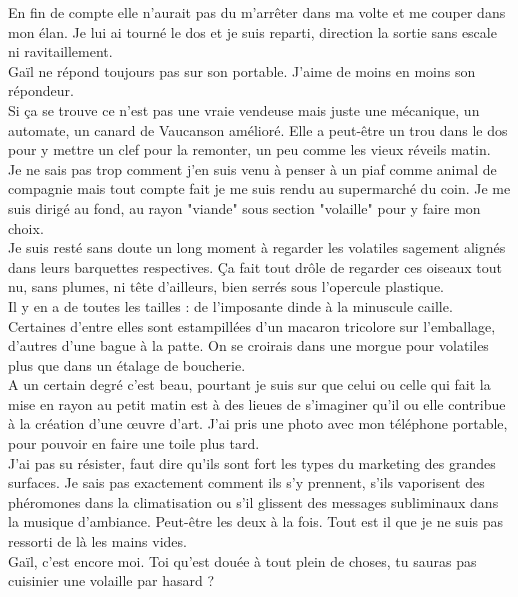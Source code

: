 En fin de compte elle n'aurait pas du m'arrêter dans ma volte et me couper dans mon élan. Je lui ai tourné le dos et je suis reparti, direction la sortie sans escale ni ravitaillement. \\

Gaïl ne répond toujours pas sur son portable. J'aime de moins en moins son répondeur. \\

Si ça se trouve ce n'est pas une vraie vendeuse mais juste une mécanique, un automate, un canard de Vaucanson amélioré. Elle a peut-être un trou dans le dos pour y mettre un clef pour la remonter, un peu comme les vieux réveils matin.\\

Je ne sais pas trop comment j'en suis venu à penser à un piaf comme animal de compagnie mais tout compte fait je me suis rendu au supermarché du coin. Je me suis dirigé au fond, au rayon "viande" sous section "volaille" pour y faire mon choix. \\
Je suis resté sans doute un long moment à regarder les volatiles sagement alignés dans leurs barquettes respectives. Ça fait tout drôle de regarder ces oiseaux tout nu, sans plumes, ni tête d'ailleurs, bien serrés sous l'opercule plastique. \\

Il y en a de toutes les tailles : de l'imposante dinde à la minuscule caille. Certaines d'entre elles sont estampillées d'un macaron tricolore sur l'emballage, d'autres d'une bague à la patte. On se croirais dans une morgue pour volatiles plus que dans un étalage de boucherie. \\
A un certain degré c'est beau, pourtant je suis sur que celui ou celle qui fait la mise en rayon au petit matin est à des lieues de s'imaginer qu'il ou elle contribue à la création d'une œuvre d'art. J'ai pris une photo avec mon téléphone portable, pour pouvoir en faire une toile plus tard. \\

J'ai pas su résister, faut dire qu'ils sont fort les types du marketing des grandes surfaces. Je sais pas exactement comment ils s'y prennent, s'ils vaporisent des phéromones dans la climatisation ou s'il glissent des messages subliminaux dans la musique d'ambiance. Peut-être les deux à la fois. Tout est il que je ne suis pas ressorti de là les mains vides.\\

Gaïl, c'est encore moi. Toi qu'est douée à tout plein de choses, tu sauras pas cuisinier une volaille par hasard ?